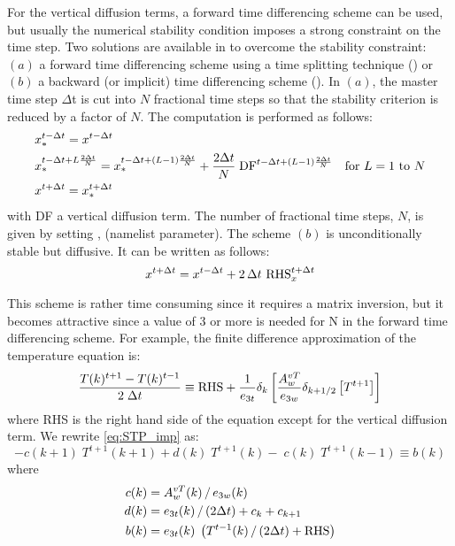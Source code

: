 \documentclass[../tex_main/NEMO_manual]{subfiles}
\begin{document}
For the vertical diffusion terms, a forward time differencing scheme can be used,
but usually the numerical stability condition imposes a strong constraint on the time step.
Two solutions are available in \NEMO to overcome the stability constraint:
$(a)$ a forward time differencing scheme using a time splitting technique () or
$(b)$ a backward (or implicit) time differencing scheme                   ().
In $(a)$, the master time step $\Delta $t is cut into $N$ fractional time steps so that
the stability criterion is reduced by a factor of $N$.
The computation is performed as follows:
\begin{equation} \label{eq:STP_ts}
\begin{split}
& x_\ast ^{t-\Delta t} = x^{t-\Delta t}   \\
& x_\ast ^{t-\Delta t+L\frac{2\Delta t}{N}}=x_\ast ^{t-\Delta t+\left( {L-1} 
\right)\frac{2\Delta t}{N}}+\frac{2\Delta t}{N}\;\text{DF}^{t-\Delta t+\left( {L-1} \right)\frac{2\Delta t}{N}}
        \quad \text{for $L=1$ to $N$}      \\
& x^{t+\Delta t} = x_\ast^{t+\Delta t}
\end{split}
\end{equation}
with DF a vertical diffusion term.
The number of fractional time steps, $N$, is given by setting , (namelist parameter).
The scheme $(b)$ is unconditionally stable but diffusive. It can be written as follows:
\begin{equation} \label{eq:STP_imp}
   x^{t+\Delta t} = x^{t-\Delta t} + 2 \, \Delta t \  \text{RHS}_x^{t+\Delta t}
\end{equation} 


This scheme is rather time consuming since it requires a matrix inversion,
but it becomes attractive since a value of 3 or more is needed for N in the forward time differencing scheme.
For example, the finite difference approximation of the temperature equation is:
\begin{equation} \label{eq:STP_imp_zdf}
\frac{T(k)^{t+1}-T(k)^{t-1}}{2\;\Delta t}\equiv \text{RHS}+\frac{1}{e_{3t} }\delta 
_k \left[ {\frac{A_w^{vT} }{e_{3w} }\delta _{k+1/2} \left[ {T^{t+1}} \right]} 
\right]
\end{equation}
where RHS is the right hand side of the equation except for the vertical diffusion term.
We rewrite \autoref{eq:STP_imp} as:
\begin{equation} \label{eq:STP_imp_mat}
-c(k+1)\;T^{t+1}(k+1) + d(k)\;T^{t+1}(k) - \;c(k)\;T^{t+1}(k-1) \equiv b(k)
\end{equation}
where 
\begin{align*} 
 c(k) &= A_w^{vT} (k) \, / \, e_{3w} (k)     \\
 d(k) &= e_{3t} (k)       \, / \, (2\Delta t) + c_k + c_{k+1}    \\
 b(k) &= e_{3t} (k) \; \left( T^{t-1}(k) \, / \, (2\Delta t) + \text{RHS} \right)    
\end{align*}
\end{document}

